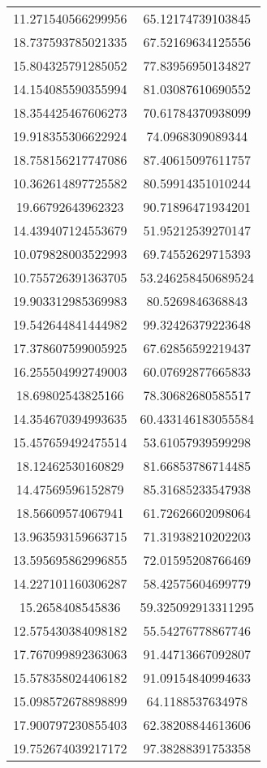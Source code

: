 \begin{table}
\begin{tabular}{cc}
11.271540566299956 & 65.12174739103845 \\
18.737593785021335 & 67.52169634125556 \\
15.804325791285052 & 77.83956950134827 \\
14.154085590355994 & 81.03087610690552 \\
18.354425467606273 & 70.61784370938099 \\
19.918355306622924 & 74.0968309089344 \\
18.758156217747086 & 87.40615097611757 \\
10.362614897725582 & 80.59914351010244 \\
19.66792643962323 & 90.71896471934201 \\
14.439407124553679 & 51.95212539270147 \\
10.079828003522993 & 69.74552629715393 \\
10.755726391363705 & 53.246258450689524 \\
19.903312985369983 & 80.5269846368843 \\
19.542644841444982 & 99.32426379223648 \\
17.378607599005925 & 67.62856592219437 \\
16.255504992749003 & 60.07692877665833 \\
18.69802543825166 & 78.30682680585517 \\
14.354670394993635 & 60.433146183055584 \\
15.457659492475514 & 53.61057939599298 \\
18.12462530160829 & 81.66853786714485 \\
14.47569596152879 & 85.31685233547938 \\
18.56609574067941 & 61.72626602098064 \\
13.963593159663715 & 71.31938210202203 \\
13.595695862996855 & 72.01595208766469 \\
14.227101160306287 & 58.42575604699779 \\
15.2658408545836 & 59.325092913311295 \\
12.575430384098182 & 55.54276778867746 \\
17.767099892363063 & 91.44713667092807 \\
15.578358024406182 & 91.09154840994633 \\
15.098572678898899 & 64.1188537634978 \\
17.900797230855403 & 62.38208844613606 \\
19.752674039217172 & 97.38288391753358 \\

\end{tabular}
\end{table}
